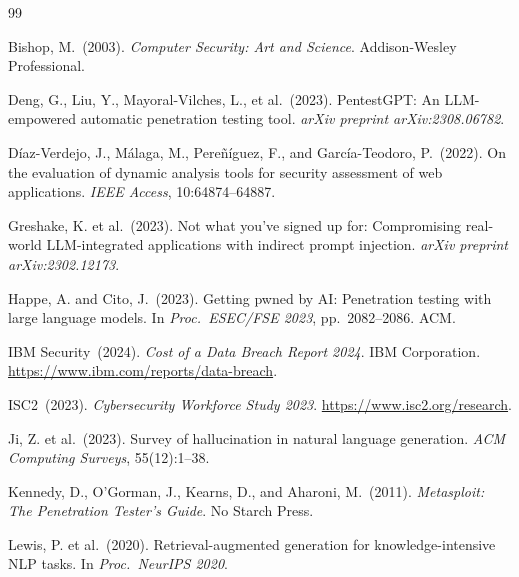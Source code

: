 \documentclass[12pt,a4paper,oneside,openany]{book}
\begin{document}
\begin{thebibliography}{99}

Bishop, M.\ (2003).
\textit{Computer Security: Art and Science}.
Addison-Wesley Professional.

Deng, G., Liu, Y., Mayoral-Vilches, L., et al.\ (2023).
PentestGPT: An LLM-empowered automatic penetration testing tool.
\textit{arXiv preprint arXiv:2308.06782}.

D{\'i}az-Verdejo, J., M{\'a}laga, M., Pere{\~n}{\'i}guez, F., and Garc{\'i}a-Teodoro, P.\ (2022).
On the evaluation of dynamic analysis tools for security assessment of web applications.
\textit{IEEE Access}, 10:64874--64887.

Greshake, K. et al.\ (2023).
Not what you've signed up for: Compromising real-world LLM-integrated applications with indirect prompt injection.
\textit{arXiv preprint arXiv:2302.12173}.

Happe, A. and Cito, J.\ (2023).
Getting pwned by AI: Penetration testing with large language models.
In \textit{Proc.\ ESEC/FSE 2023}, pp.\ 2082--2086. ACM.

IBM Security\ (2024).
\textit{Cost of a Data Breach Report 2024}.
IBM Corporation.
\url{https://www.ibm.com/reports/data-breach}.

ISC2\ (2023).
\textit{Cybersecurity Workforce Study 2023}.
\url{https://www.isc2.org/research}.

Ji, Z. et al.\ (2023).
Survey of hallucination in natural language generation.
\textit{ACM Computing Surveys}, 55(12):1--38.

Kennedy, D., O'Gorman, J., Kearns, D., and Aharoni, M.\ (2011).
\textit{Metasploit: The Penetration Tester's Guide}.
No Starch Press.

Lewis, P. et al.\ (2020).
Retrieval-augmented generation for knowledge-intensive NLP tasks.
In \textit{Proc.\ NeurIPS 2020}.


\end{thebibliography}
\end{document}
